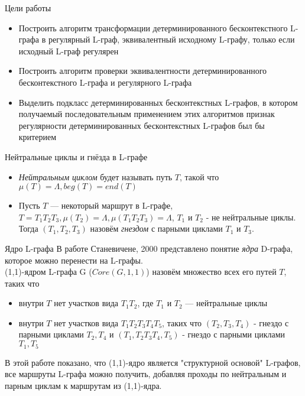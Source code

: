 \documentclass{beamer}
\begin{document}
\begin{frame} {Цели работы}
\begin{itemize}
  \item Построить алгоритм трансформации детерминированного бесконтекстного L-графа в регулярный L-граф, эквивалентный исходному L-графу, только если исходный L-граф регулярен
  \item Построить алгоритм проверки эквивалентности детерминированного бесконтекстного L-графа и регулярного L-графа
  \item Выделить подкласс детерминированных бесконтекстных L-графов, в котором получаемый последовательным применением этих алгоритмов признак регулярности детерминированных бесконтекстных L-графов был бы критерием
\end{itemize}
\end{frame}

\begin{frame} {Нейтральные циклы и гнёзда в L-графе}
\begin{itemize}
  \item \textit{Нейтральным циклом} будет называть путь $T$, такой что $\mu(T) = \Lambda, beg(T) = end(T)$\\
  \item Пусть $T$ --- некоторый маршрут в L-графе, $T=T_1T_2T_3, \mu(T_2) = \Lambda, \mu(T_1T_2T_3) = \Lambda$, $T_1$ и $T_2$ - не нейтральные циклы. Тогда $(T_1,T_2,T_3)$ назовём \textit{гнездом} с парными циклами $T_1$ и $T_3$.
\end{itemize}
\end{frame}

\begin{frame}{Ядро L-графа}
В работе Станевичене, 2000 представлено понятие \textit{ядра} D-графа, которое можно перенести на L-графы.\\
\vspace{0.3cm}
(1,1)-ядром L-графа G ($Core(G,1,1)$) назовём множество всех его путей $T$, таких что
\begin{itemize}
  \item внутри $T$ нет участков вида $T_1T_2$, где $T_1 \text{ и } T_2$ --- нейтральные циклы
  \item внутри $T$ нет участков вида $T_1T_2T_3T_4T_5$, таких что $(T_2,T_3,T_4)$ - гнездо с парными циклами $T_2,T_4$ и $(T_1,T_2T_3T_4,T_5)$ - гнездо с парными циклами $T_1,T_5$
\end{itemize}

В этой работе показано, что (1,1)-ядро является "структурной основой"  L-графов, все маршруты L-графа можно получить, добавляя проходы по нейтральным и парным циклам к маршрутам из (1,1)-ядра.
\end{frame}
\end{document}
